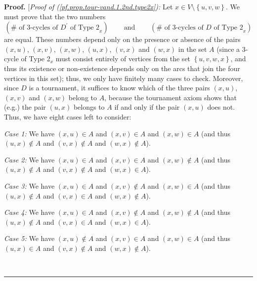 \documentclass[numbers=enddot,12pt,final,onecolumn,notitlepage]{scrartcl}%
\numberwithin{exer}{subsection}
\theoremstyle{definition}
\newenvironment{proof}[1][Proof]{\noindent\textbf{#1.} }{\ \rule{0.5em}{0.5em}}
\begin{document}
\begin{proof}
[\textit{Proof of (\ref{pf.prop.tour-vand.1.2nd.type2x}):} Let $x\in
V\setminus\left\{  u,v,w\right\}  $. We must prove that the two numbers
\[
\left(  \#\text{ of }3\text{-cycles of }D^{\prime}\text{ of Type 2}%
_{x}\right)  \ \ \ \ \ \ \ \ \ \ \text{and}\ \ \ \ \ \ \ \ \ \ \left(
\#\text{ of }3\text{-cycles of }D\text{ of Type 2}_{x}\right)
\]
are equal. These numbers depend only on the presence or absence of the pairs
$\left(  x,u\right)  $, $\left(  x,v\right)  $, $\left(  x,w\right)  $,
$\left(  u,x\right)  $, $\left(  v,x\right)  $ and $\left(  w,x\right)  $ in
the set $A$ (since a $3$-cycle of Type 2$_{x}$ must consist entirely of
vertices from the set $\left\{  u,v,w,x\right\}  $, and thus its existence or
non-existence depends only on the arcs that join the four vertices in this
set); thus, we only have finitely many cases to check. Moreover, since $D$ is
a tournament, it suffices to know which of the three pairs $\left(
x,u\right)  $, $\left(  x,v\right)  $ and $\left(  x,w\right)  $ belong to
$A$, because the tournament axiom shows that (e.g.) the pair $\left(
u,x\right)  $ belongs to $A$ if and only if the pair $\left(  x,u\right)  $
does not. Thus, we have eight cases left to consider:

\textit{Case 1:} We have $\left(  x,u\right)  \in A$ and $\left(  x,v\right)
\in A$ and $\left(  x,w\right)  \in A$ (and thus $\left(  u,x\right)  \notin
A$ and $\left(  v,x\right)  \notin A$ and $\left(  w,x\right)  \notin A$).

\textit{Case 2:} We have $\left(  x,u\right)  \in A$ and $\left(  x,v\right)
\in A$ and $\left(  x,w\right)  \notin A$ (and thus $\left(  u,x\right)
\notin A$ and $\left(  v,x\right)  \notin A$ and $\left(  w,x\right)  \in A$).

\textit{Case 3:} We have $\left(  x,u\right)  \in A$ and $\left(  x,v\right)
\notin A$ and $\left(  x,w\right)  \in A$ (and thus $\left(  u,x\right)
\notin A$ and $\left(  v,x\right)  \in A$ and $\left(  w,x\right)  \notin A$).

\textit{Case 4:} We have $\left(  x,u\right)  \in A$ and $\left(  x,v\right)
\notin A$ and $\left(  x,w\right)  \notin A$ (and thus $\left(  u,x\right)
\notin A$ and $\left(  v,x\right)  \in A$ and $\left(  w,x\right)  \in A$).

\textit{Case 5:} We have $\left(  x,u\right)  \notin A$ and $\left(
x,v\right)  \in A$ and $\left(  x,w\right)  \in A$ (and thus $\left(
u,x\right)  \in A$ and $\left(  v,x\right)  \notin A$ and $\left(  w,x\right)
\notin A$).


\end{proof}
\end{document}
